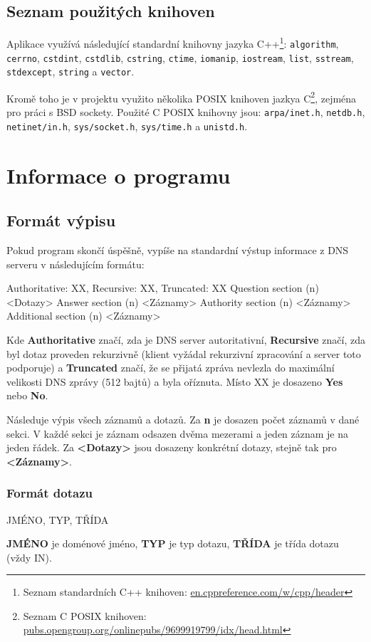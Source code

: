 \documentclass[a4paper,12pt]{article}
\begin{document}
\subsection{Seznam použitých knihoven}

Aplikace využívá následující standardní knihovny jazyka C++\footnote{Seznam standardních C++ knihoven: \url{en.cppreference.com/w/cpp/header}}: 
\texttt{algorithm},
\texttt{cerrno},
\texttt{cstdint},
\texttt{cstdlib},
\texttt{cstring},
\texttt{ctime},
\texttt{iomanip},
\texttt{iostream},
\texttt{list},
\texttt{sstream},
\texttt{stdexcept},
\texttt{string} a
\texttt{vector}.

Kromě toho je v projektu využito několika POSIX knihoven jazkya C\footnote{Seznam C POSIX knihoven: \url{pubs.opengroup.org/onlinepubs/9699919799/idx/head.html}}, zejména pro práci s BSD sockety. Použité C POSIX knihovny jsou:
\texttt{arpa/inet.h},
\texttt{netdb.h},
\texttt{netinet/in.h},
\texttt{sys/socket.h},
\texttt{sys/time.h} a
\texttt{unistd.h}.

\newpage
\section{Informace o programu}

\subsection{Formát výpisu}
Pokud program skončí úspěšně, vypíše na standardní výstup informace z DNS serveru v následujícím formátu:
\begin{cppcode}
Authoritative: XX, Recursive: XX, Truncated: XX
Question section (n)
  <Dotazy>
Answer section (n)
  <Záznamy>
Authority section (n)
  <Záznamy>
Additional section (n)
  <Záznamy>
\end{cppcode}
Kde \textbf{Authoritative} značí, zda je DNS server autoritativní, \textbf{Recursive} značí, zda byl dotaz proveden rekurzivně (klient vyžádal rekurzivní zpracování a server toto podporuje) a \textbf{Truncated} značí, že se přijatá zpráva nevlezla do maximální velikosti DNS zprávy (512 bajtů) a byla oříznuta. Místo XX je dosazeno \textbf{Yes} nebo \textbf{No}.

Následuje výpis všech záznamů a dotazů. Za \textbf{n} je dosazen počet záznamů v dané sekci. V každé sekci je záznam odsazen dvěma mezerami a jeden záznam je na jeden řádek. Za \textbf{<Dotazy>} jsou dosazeny konkrétní dotazy, stejně tak pro \textbf{<Záznamy>}.

\subsubsection{Formát dotazu}
\begin{cppcode}
JMÉNO, TYP, TŘÍDA
\end{cppcode}
\textbf{JMÉNO} je doménové jméno, \textbf{TYP} je typ dotazu, \textbf{TŘÍDA} je třída dotazu (vždy IN).
\end{document}
